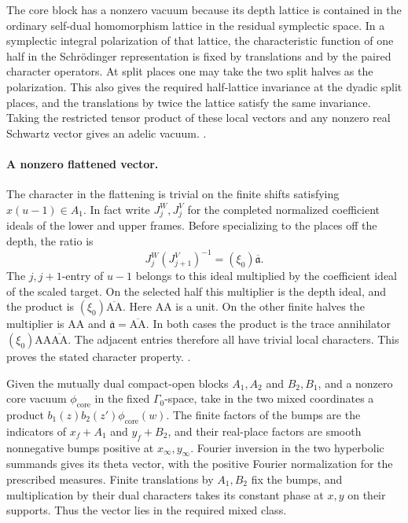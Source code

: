 The core block has a nonzero vacuum because its depth
lattice is contained in the ordinary self-dual
homomorphism lattice in the residual symplectic space.
In a symplectic integral polarization of that lattice,
the characteristic function of one half in the
Schr\"odinger representation is fixed by translations
and by the paired character operators. At split places
one may take the two split halves as the polarization.
This also gives the required half-lattice invariance
at the dyadic split places, and the translations by
twice the lattice satisfy the same invariance. Taking
the restricted tensor product of these local vectors and
any nonzero real Schwartz vector gives an adelic vacuum.
.

\paragraph{A nonzero flattened vector.}
The character in the flattening is trivial on the finite
shifts satisfying \(x(u-1)\in A_1\). In fact write
\(J_j^W,J_j^V\) for the completed normalized coefficient
ideals of the lower and upper frames. Before specializing
to the places off the depth, the ratio is
\[
 J_j^W(J_{j+1}^V)^{-1}=(\xi_0)\overline{\mathfrak a}.
\]
The \(j,j+1\)-entry of \(u-1\) belongs to this ideal
multiplied by the coefficient ideal of the scaled target.
On the selected half this multiplier is the depth ideal,
and the product is
\((\xi_0)\overline{\mathrm{AA}}\). Here
\(\mathrm{AA}\) is a unit. On the other finite halves
the multiplier is \(\mathrm{AA}\) and
\(\overline{\mathfrak a}=\overline{\mathrm{AA}}\).
In both cases the product is the trace annihilator
\((\xi_0)\mathrm{AA}\overline{\mathrm{AA}}\).
The adjacent entries therefore all have trivial local
characters. This proves the stated character property.
.

Given the mutually dual compact-open blocks
\(A_1,A_2\) and \(B_2,B_1\), and a nonzero core
vacuum \(\phi_{\mathrm{core}}\) in the fixed \(\Gamma_0\)-space,
take in the two mixed coordinates a product
\(b_1(z)b_2(z')\phi_{\mathrm{core}}(w)\). The finite factors of the
bumps are the indicators of \(x_f+A_1\) and
\(y_f+B_2\), and their real-place factors are smooth nonnegative
bumps positive at \(x_\infty,y_\infty\). Fourier inversion
in the two hyperbolic summands gives its theta vector,
with the positive Fourier normalization for the prescribed
measures. Finite translations by \(A_1,B_2\) fix the bumps,
and multiplication by their dual characters takes its
constant phase at \(x,y\) on their supports. Thus the
vector lies in the required mixed class.

